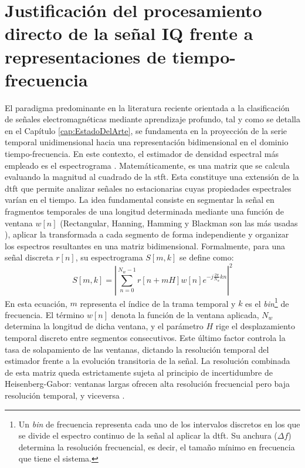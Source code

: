 \section{Justificación del procesamiento directo de la señal IQ  frente a representaciones de tiempo-frecuencia}
\label{sec:justificacion_procesamiento_IQ}

El paradigma predominante en la literatura reciente orientada a la clasificación de señales electromagnéticas mediante aprendizaje profundo, tal y como se detalla en el Capítulo \ref{cap:EstadoDelArte}, se fundamenta en la proyección de la serie temporal unidimensional hacia una representación bidimensional en el dominio tiempo-frecuencia. En este contexto, el estimador de densidad espectral más empleado es el espectrograma \cite{gluge_robust_2024, zhao_drone_2024}. Matemáticamente, es una matriz que se calcula evaluando la magnitud al cuadrado de la \gls{stft}. Esta constituye una extensión de la \gls{dtft} que permite analizar señales no estacionarias cuyas propiedades espectrales varían en el tiempo. La idea fundamental consiste en segmentar la señal en fragmentos temporales de una longitud determinada mediante una función de ventana $w[n]$ (Rectangular, Hanning, Hamming y Blackman son las más usadas \cite{zhang_window, harris_window}), aplicar la transformada a cada segmento de forma independiente y organizar los espectros resultantes en una matriz bidimensional. Formalmente, para una señal discreta $r[n]$, su espectrograma $S[m,k]$ se define como:
\begin{equation}
    S[m,k] = \left| \sum_{n=0}^{N_w-1} r[n+mH] w[n] e^{-j\frac{2\pi}{N_w}kn} \right|^2
    \label{eq:espectrograma}
\end{equation}
En esta ecuación, $m$ representa el índice de la trama temporal y $k$ es el \textit{bin}\footnote{Un \textit{bin} de frecuencia representa cada uno de los intervalos discretos en los que se divide el espectro continuo de la señal al aplicar la \gls{dtft}. Su anchura ($\Delta f$) determina la resolución frecuencial, es decir, el tamaño mínimo en frecuencia que tiene el sistema.} de frecuencia. El término $w[n]$ denota la función de la ventana aplicada, $N_w$ determina la longitud de dicha ventana, y el parámetro $H$ rige el desplazamiento temporal discreto entre segmentos consecutivos. Este último factor controla la tasa de solapamiento de las ventanas, dictando la resolución temporal del estimador frente a la evolución transitoria de la señal. La resolución combinada de esta matriz queda estrictamente sujeta al principio de incertidumbre de Heisenberg-Gabor: ventanas largas ofrecen alta resolución frecuencial pero baja resolución temporal, y viceversa \cite{oppenheim_discrete_2014}.

